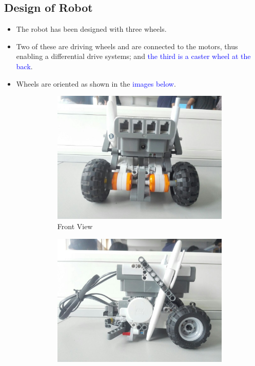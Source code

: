 \documentclass[10pt,a4paper]{article}
\begin{document}
			\subsection{Design of Robot}
				\begin{itemize}
					\item The robot has been designed with three wheels.
					\item Two of these are driving wheels and are connected to the motors, thus enabling a differential drive systems; and \textcolor{blue}{the third is a caster wheel at the back}.
					\item Wheels are oriented as shown in the \textcolor{blue}{images below}.
					\begin{figure}[H]
						\begin{subfigure}{0.5\textwidth}
							\centering
							\includegraphics[width=0.8\linewidth]{img/front.jpeg}
							\caption{Front View}
							\label{fig:fview}
						\end{subfigure}%
						\begin{subfigure}{0.5\textwidth}
							\centering
							\includegraphics[width=0.8\linewidth]{img/right.jpeg}

\end{subfigure}
\end{figure}
\end{itemize}
\end{document}
